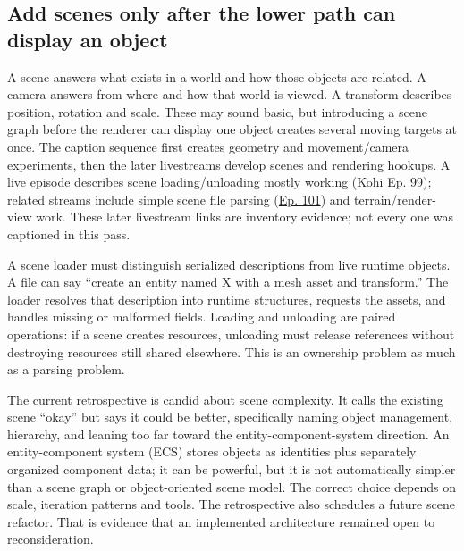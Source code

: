 \subsection{Add scenes only after the lower path can display an object}\label{06-engine-ii-ch032-add-scenes-only-after-the-lower-path-can-display-an-object}

\hypertarget{06-engine-ii-ch032-add-scenes-only-after-the-lower-path-can-display-an-object}{}

A scene answers what exists in a world and how those objects are related. A camera answers from where and how that world is viewed. A transform describes position, rotation and scale. These may sound basic, but introducing a scene graph before the renderer can display one object creates several moving targets at once. The caption sequence first creates geometry and movement/camera experiments, then the later livestreams develop scenes and rendering hookups. A live episode describes scene loading/unloading mostly working (\href{https://www.youtube.com/watch?v=N7sc-i-wryw}{Kohi Ep. 99}); related streams include simple scene file parsing (\href{https://www.youtube.com/watch?v=q8AfndGO-Ms}{Ep. 101}) and terrain/render-view work. These later livestream links are inventory evidence; not every one was captioned in this pass.

A scene loader must distinguish serialized descriptions from live runtime objects. A file can say ``create an entity named X with a mesh asset and transform.'' The loader resolves that description into runtime structures, requests the assets, and handles missing or malformed fields. Loading and unloading are paired operations: if a scene creates resources, unloading must release references without destroying resources still shared elsewhere. This is an ownership problem as much as a parsing problem.

The current retrospective is candid about scene complexity. It calls the existing scene ``okay'' but says it could be better, specifically naming object management, hierarchy, and leaning too far toward the entity-component-system direction. An entity-component system (ECS) stores objects as identities plus separately organized component data; it can be powerful, but it is not automatically simpler than a scene graph or object-oriented scene model. The correct choice depends on scale, iteration patterns and tools. The retrospective also schedules a future scene refactor. That is evidence that an implemented architecture remained open to reconsideration.

